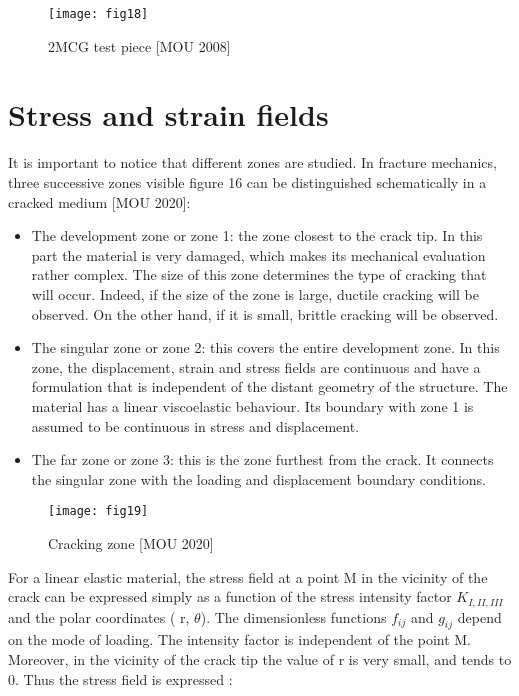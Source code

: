 \graphicspath{{Images/}}
\begin{figure}[htp]
	\centering
	\texttt{[image: fig18]}
	\caption{2MCG test piece [MOU 2008]}
	\label{fig:galaxy}
\end{figure}

\section{Stress and strain fields}

It is important to notice that different zones are studied. In fracture mechanics, three successive zones visible figure 16 can be distinguished schematically in a cracked medium [MOU 2020]:

\begin{itemize}
	\item The development zone or zone 1: the zone closest to the crack tip. In this part the material is very damaged, which makes its mechanical evaluation rather complex. The size of this zone determines the type of cracking that will occur. Indeed, if the size of the zone is large, ductile cracking will be observed. On the other hand, if it is small, brittle cracking will be observed.
	\item The singular zone or zone 2: this covers the entire development zone. In this zone, the displacement, strain and stress fields are continuous and have a formulation that is independent of the distant geometry of the structure. The material has a linear viscoelastic behaviour. Its boundary with zone 1 is assumed to be continuous in stress and displacement.
	\item The far zone or zone 3: this is the zone furthest from the crack. It connects the singular zone with the loading and displacement boundary conditions.
\end{itemize}

\graphicspath{{Images/}}
\begin{figure}[htp]
	\centering
	\texttt{[image: fig19]}
	\caption{Cracking zone [MOU 2020]}
	\label{fig:galaxy}
\end{figure}

For a linear elastic material, the stress field at a point M in the vicinity of the crack can be expressed simply as a function of the stress intensity factor $K_{I,II,III}$ and the polar coordinates ( r, $\theta$). The dimensionless functions $f_{ij}$  and  $g_{ij}$ depend on the mode of loading. The intensity factor is independent of the point M. Moreover, in the vicinity of the crack tip the value of r is very small, and tends to 0. Thus the stress field is expressed :

